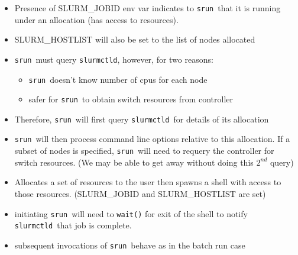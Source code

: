 \documentclass[article,letter,landscape]{seminar}
\newcommand{\slurmctld}{{\tt slurmctld}}
\newcommand{\srun}{{\tt srun}}
\begin{document}
\begin{slide}
  \begin{center}
  \begin{itemize}
    \item Presence of SLURM\_JOBID env var indicates to \srun\ that it
          is running under an allocation (has access to resources).
    \item SLURM\_HOSTLIST will also be set to the list of nodes allocated
    \item \srun\ must query \slurmctld , however, for two reasons:
    \begin{itemize}
      \item \srun\ doesn't know number of cpus for each node
      \item safer for \srun\ to obtain switch resources from controller 
    \end{itemize}
    \item Therefore, \srun\ will first query \slurmctld\ for details of
          its allocation
    \item \srun\ will then process command line options relative to this
          allocation. If a subset of nodes is specified, \srun\ will need
	  to requery the controller for switch resources. (We may be 
	  able to get away without doing this $2^{nd}$ query)
  \end{itemize}
  \end{center}
\end{slide}

\begin{slide}
  \begin{center}
  \begin{itemize}
  \item Allocates a set of resources to the
        user then spawns a shell with access to those resources.
	(SLURM\_JOBID and SLURM\_HOSTLIST are set)
  \item initiating \srun\ will need to {\tt wait()} for exit
        of the shell to notify \slurmctld\ that job is complete.
  \item subsequent invocations of \srun\ behave as in the batch run
        case
  \end{itemize}
  \end{center}
\end{slide}
\end{document}
